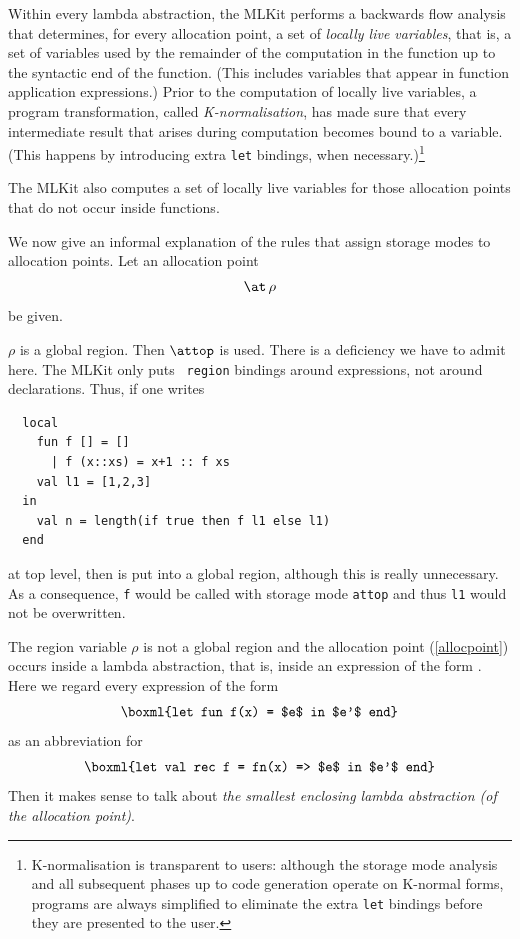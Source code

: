 \documentclass[12pt]{book}
\begin{document}
Within every lambda abstraction, the MLKit performs a backwards flow
analysis that determines, for every allocation point, a set of
%
{\em locally live variables}, that is, a set of variables used by the
remainder of the computation in the function up to the syntactic end
of the function. (This includes variables that appear in function
application expressions.) Prior to the computation of locally live
variables, a program transformation, called
%
\label{K-normal-form}%
{\em K-normalisation}, has made sure that every intermediate result
that arises during computation becomes bound to a variable. (This
happens by introducing extra {\tt let} bindings, when
necessary.)\footnote{K-normalisation is transparent to users: although
  the storage mode analysis and all subsequent phases up to code
  generation operate on K-normal forms, programs are always simplified
  to eliminate the extra {\tt let} bindings before they are presented
  to the user.}

The MLKit also computes a set of locally live variables for those
allocation points that do not occur inside functions.

We now give an informal explanation of the rules that assign storage
modes to allocation points.  Let an allocation point
\begin{equation}
\label{allocpoint}\at\,\rho
\end{equation}
be given.
\bigskip

 $\rho$ is a global region. Then $\attop$ is used.
There is a deficiency we have to admit here. The MLKit only puts {\tt
  region} bindings around expressions, not around declarations. Thus, if one
writes
\begin{verbatim}
  local
    fun f [] = []
      | f (x::xs) = x+1 :: f xs
    val l1 = [1,2,3]
  in
    val n = length(if true then f l1 else l1)
  end
\end{verbatim}

\noindent
at top level, then  is put into a global region, although
this is really unnecessary. As a consequence, {\tt f} would be called
with storage mode {\tt attop} and thus {\tt l1} would not be
overwritten.  \bigskip

The region variable $\rho$ is not a global region and the allocation
point (\ref{allocpoint}) occurs inside a lambda abstraction, that is,
inside an expression of the form .  Here we
regard every expression of the form
$$\boxml{let fun f(x) = $e$ in $e'$ end}$$ as an abbreviation for
$$\boxml{let val rec f = fn(x) => $e$ in $e'$ end}$$
Then it makes
sense to talk about {\em the smallest enclosing lambda abstraction (of
  the allocation point)}.
\end{document}
